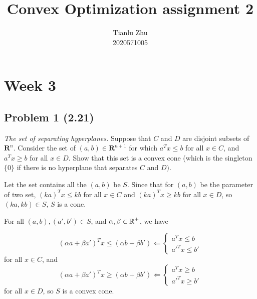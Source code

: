 \documentclass[en,hazy,blue,12pt,device = pad]{elegantnote}
\title{Convex Optimization assignment 2}
\author{Tianlu Zhu \\ 2020571005}
\date{}
\begin{document}
\maketitle

\section*{Week 3}
\subsection*{Problem 1 (2.21)}
\textit{The set of separating hyperplanes.} Suppose that \(C\) and \(D\) are disjoint subsets of \(\mathbf{R}^n\). Consider the set of \((a, b) \in \mathbf{R}^{n+1}\) for which \(a^T x \leq b\) for all \(x \in C\), and \(a^T x \geq b\) for all \(x \in D\). Show that this set is a convex cone (which is the singleton \(\{0\}\) if there is no hyperplane that separates \(C\) and \(D)\).

\begin{tcolorbox}
    \sol 

    Let the set contains all the \((a,b)\) be \(S\). Since that for \((a,b)\) be the parameter of two set, \((ka)^T x \leq kb\) for all \(x\in C\) and \((ka)^T x \geq kb\) for all \(x \in D\), so \((ka,kb) \in S\), \(S\) is a cone.

    For all \((a,b),(a',b')\in S\), and \(\alpha,\beta \in \operatorname{\mathbb R}^+\), we have

    \[(\alpha a+\beta a')^T x \leq (\alpha b + \beta b') \Leftarrow \begin{cases}
        a^T x \leq b \\
        a'^T x \leq b'
    \end{cases} \]
    for all \(x \in C\), and
    \[(\alpha a+\beta a')^T x \geq (\alpha b + \beta b') \Leftarrow \begin{cases}
        a^T x \geq b \\
        a'^T x \geq b'
    \end{cases} \]
    for all \(x\in D\), so \(S \) is a convex cone.
\end{tcolorbox}
\end{document}
